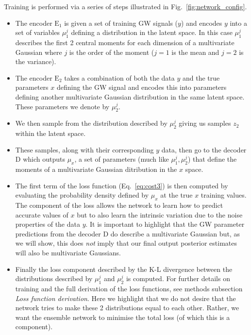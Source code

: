 \documentclass[%
showpacs,
 amsmath,amssymb,
 aps,
 twocolumn,
 prl,
 reprint,
floatfix,
]{revtex4-1}
\begin{document}
%
%
Training is performed via a series of steps illustrated in
Fig.~\ref{fig:network_config}.
%
\begin{itemize}
%
\item The encoder $\textrm{E}_1$ is given a set of training \ac{GW} signals
($y$) and encodes $y$ into a set of variables $\mu^{j}_{1}$ defining a
distribution in the latent space. In this case $\mu^{j}_{1}$ describes the
first 2 central moments for each dimension of a multivariate Gaussian where $j$
is the order of the moment ($j=1$ is the mean and $j=2$ is the variance).
%
\item The encoder $\textrm{E}_2$ takes a combination of both the data $y$ and
the true parameters $x$ defining the \ac{GW} signal and encodes this into
parameters defining another multivariate Gaussian distribution in the same
latent space. These parameters we denote by $\mu^{j}_{2}$.
%
\item We then sample from the distribution described by $\mu^{j}_{2}$
giving us samples $z_{2}$ within the latent space.
%
\item These samples, along with their corresponding $y$ data, then go to the
decoder D which outputs $\mu_{x}$, a set of parameters (much like
$\mu^{j}_{1},\mu^{j}_{2}$) that define the moments of a multivariate Gaussian
ditribution in the $x$ space.
\item The first term of the loss function (Eq.~\ref{eq:cost3}) is then computed
by evaluating the probability density defined by $\mu_x$ at the true $x$
training values. The component of the loss allows the network to learn how to
predict accurate values of $x$ but to also learn the intrinsic variation due to
the noise properties of the data $y$. It is important to highlight that the
\ac{GW} parameter predictions from the decoder D do describe a multivariate
Gaussian but, as we will show, this does \emph{not} imply that our final output
posterior estimates will also be multivariate Gaussians.
%
\item Finally the loss component described by the K-L divergence between the
distributions described by $\mu^{j}_1$ and $\mu^{j}_2$ is computed. For further
details on training and the full derivation of the loss functions, see methods
subsection \textit{Loss function derivation}. Here we highlight that we do not
desire that the network tries to make these 2 distributions equal to each
other. Rather, we want the ensemble network to minimise the total loss (of
which this is a component).
%
\end{itemize}
\end{document}
